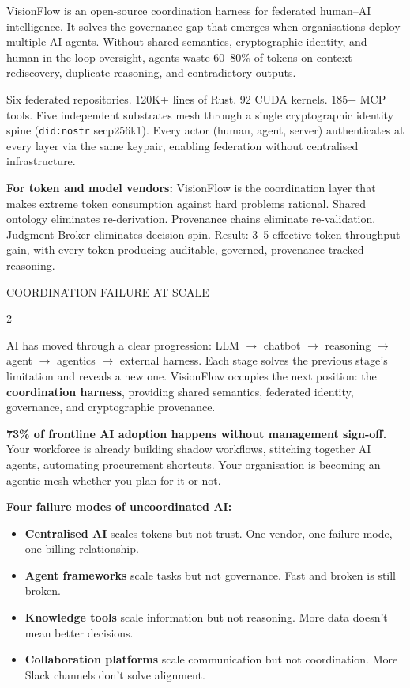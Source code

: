 \documentclass[10pt,a4paper]{article}
\newcommand{\sectiontag}[1]{%
  \vspace{6pt}%
  {\footnotesize\color{gold}\MakeUppercase{#1}}\\[-1pt]%
}
\begin{document}
{\small
VisionFlow is an open-source coordination harness for federated human--AI intelligence. It solves the governance gap that emerges when organisations deploy multiple AI agents. Without shared semantics, cryptographic identity, and human-in-the-loop oversight, agents waste 60--80\% of tokens on context rediscovery, duplicate reasoning, and contradictory outputs.

Six federated repositories. 120K+ lines of Rust. 92 CUDA kernels. 185+ MCP tools. Five independent substrates mesh through a single cryptographic identity spine (\texttt{did:nostr} secp256k1). Every actor (human, agent, server) authenticates at every layer via the same keypair, enabling federation without centralised infrastructure.

\textbf{For token and model vendors:} VisionFlow is the coordination layer that makes extreme token consumption against hard problems rational. Shared ontology eliminates re-derivation. Provenance chains eliminate re-validation. Judgment Broker eliminates decision spin. Result: 3--5\texttimes{} effective token throughput gain, with every token producing auditable, governed, provenance-tracked reasoning.
}

\sectiontag{Coordination Failure at Scale}

\begin{multicols}{2}
\raggedright

{\small
AI has moved through a clear progression: LLM $\to$ chatbot $\to$ reasoning $\to$ agent $\to$ agentics $\to$ external harness. Each stage solves the previous stage's limitation and reveals a new one. VisionFlow occupies the next position: the \textbf{coordination harness}, providing shared semantics, federated identity, governance, and cryptographic provenance.

\textbf{73\% of frontline AI adoption happens without management sign-off.} Your workforce is already building shadow workflows, stitching together AI agents, automating procurement shortcuts. Your organisation is becoming an agentic mesh whether you plan for it or not.
}

\columnbreak

{\small
\textbf{Four failure modes of uncoordinated AI:}
\begin{itemize}[leftmargin=8pt,itemsep=1pt,parsep=0pt,topsep=2pt,label={\color{crimson}\faTimes}]
  \item \textbf{Centralised AI} scales tokens but not trust. One vendor, one failure mode, one billing relationship.
  \item \textbf{Agent frameworks} scale tasks but not governance. Fast and broken is still broken.
  \item \textbf{Knowledge tools} scale information but not reasoning. More data doesn't mean better decisions.
  \item \textbf{Collaboration platforms} scale communication but not coordination. More Slack channels don't solve alignment.
\end{itemize}
}

\end{multicols}
\end{document}
